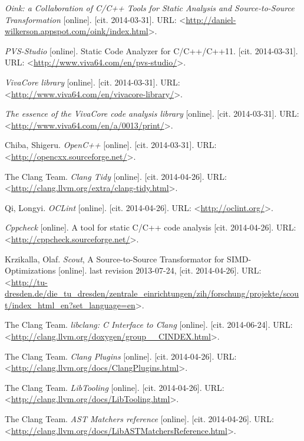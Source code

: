 \begin{thebibliography}{99}
	\emph{Oink: a Collaboration of C/C++ Tools for Static Analysis and Source-to-Source Transformation} [online].
	[cit. 2014-03-31].
	URL: <\url{http://daniel-wilkerson.appspot.com/oink/index.html}>.
	
	\emph{PVS-Studio} [online].
	Static Code Analyzer for C/C++/C++11.
	[cit. 2014-03-31].
	URL: <\url{http://www.viva64.com/en/pvs-studio/}>.	
	
	\emph{VivaCore library} [online].
	[cit. 2014-03-31].
	URL: <\url{http://www.viva64.com/en/vivacore-library/}>.
	
	\emph{The essence of the VivaCore code analysis library} [online].
	[cit. 2014-03-31].
	URL: <\url{http://www.viva64.com/en/a/0013/print/}>.

	{\sc Chiba}, Shigeru.
	\emph{OpenC++} [online].
	[cit. 2014-03-31].
	URL: <\url{http://opencxx.sourceforge.net/}>.
	
	{\sc The Clang Team}.
	\emph{Clang Tidy} [online].
	[cit. 2014-04-26].
	URL: <\url{http://clang.llvm.org/extra/clang-tidy.html}>.
	
	{\sc Qi}, Longyi.
	\emph{OCLint} [online].
	[cit. 2014-04-26].
	URL: <\url{http://oclint.org/}>.
	
	\emph{Cppcheck} [online].
	A tool for static C/C++ code analysis [cit. 2014-04-26].
	URL: <\url{http://cppcheck.sourceforge.net/}>.
	
	{\sc Krzikalla}, Olaf.
	\emph{Scout}, A Source-to-Source Transformator for SIMD-Optimizations [online].
	last revision 2013-07-24, [cit. 2014-04-26].
	URL: <\url{http://tu-dresden.de/die_tu_dresden/zentrale_einrichtungen/zih/forschung/projekte/scout/index_html_en?set_language=en}>.
	
	{\sc The Clang Team}.
	\emph{libclang: C Interface to Clang} [online].
	[cit. 2014-06-24].
	URL: <\url{http://clang.llvm.org/doxygen/group__CINDEX.html}>.
	
	{\sc The Clang Team}.
	\emph{Clang Plugins} [online].
	[cit. 2014-04-26].
	URL: <\url{http://clang.llvm.org/docs/ClangPlugins.html}>.
	
	{\sc The Clang Team}.
	\emph{LibTooling} [online].
	[cit. 2014-04-26].
	URL: <\url{http://clang.llvm.org/docs/LibTooling.html}>.
	
	{\sc The Clang Team}.
	\emph{AST Matchers reference} [online].
	[cit. 2014-04-26].
	URL: <\url{http://clang.llvm.org/docs/LibASTMatchersReference.html}>.
	

\end{thebibliography}
